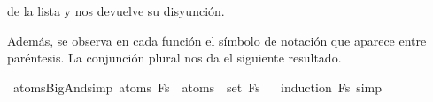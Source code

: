 \begin{isabellebody}
\begin{isamarkuptext}
\begin{description}
de la lista y  nos devuelve su disyunción.
  \end{description}
Además, se observa en cada función el símbolo de notación que aparece entre paréntesis.
La conjunción plural nos da el siguiente resultado.%
\end{isamarkuptext}\isamarkuptrue%
\isamarkupfalse%
\ atoms{\isacharunderscore}BigAnd{\isacharbrackleft}simp{\isacharbrackright}{\isacharcolon}\ {\isachardoublequoteopen}atoms\ {\isacharparenleft}\isactrlbold {\isasymAnd}Fs{\isacharparenright}\ {\isacharequal}\ {\isasymUnion}{\isacharparenleft}atoms\ {\isacharbackquote}\ set\ Fs{\isacharparenright}{\isachardoublequoteclose}\isanewline
%
\isadelimproof
\ \ %
\endisadelimproof
%
\isatagproof
{}\isamarkupfalse%
{\isacharparenleft}induction\ Fs{\isacharsemicolon}\ simp{\isacharparenright}\isanewline
\isanewline
%
\endisatagproof
{\isafoldproof}%
%
\isadelimproof
%
\endisadelimproof
%
\isadelimtheory
%
\endisadelimtheory
%
\isatagtheory
%
\endisatagtheory
{\isafoldtheory}%
%
\isadelimtheory
%
\endisadelimtheory
%
\end{isabellebody}%
\endinput

